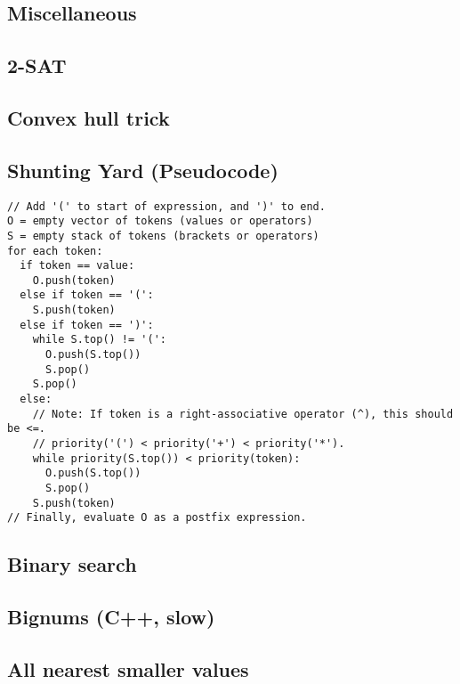 \documentclass[9pt]{extarticle}
\begin{document}
\begin{multicols*}{3}
\section{Miscellaneous}

\subsection{2-SAT} %


\subsection{Convex hull trick} %


\subsection{Shunting Yard (Pseudocode)} %
\begin{lstlisting}
// Add '(' to start of expression, and ')' to end.
O = empty vector of tokens (values or operators)
S = empty stack of tokens (brackets or operators)
for each token:
  if token == value:
    O.push(token)
  else if token == '(':
    S.push(token)
  else if token == ')':
    while S.top() != '(':
      O.push(S.top())
      S.pop()
    S.pop()
  else:
    // Note: If token is a right-associative operator (^), this should be <=.
	// priority('(') < priority('+') < priority('*').
    while priority(S.top()) < priority(token):
      O.push(S.top())
      S.pop()
    S.push(token)
// Finally, evaluate O as a postfix expression.
\end{lstlisting}

\subsection{Binary search} %


\subsection{Bignums (C++, slow)} %


\subsection{All nearest smaller values} %



\end{multicols*}
\end{document}

